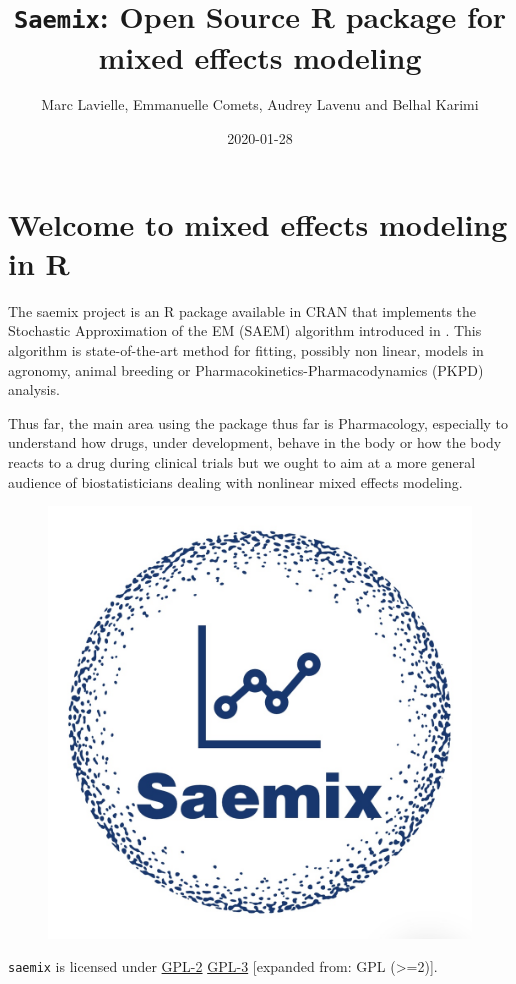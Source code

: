 \documentclass[]{book}
\title{\texttt{Saemix}: Open Source R package for mixed effects modeling}
\author{Marc Lavielle, Emmanuelle Comets, Audrey Lavenu and Belhal Karimi}
\date{2020-01-28}
\begin{document}
\maketitle

{
\hypersetup{linkcolor=black}
\setcounter{tocdepth}{1}
\tableofcontents
}
\chapter*{Welcome to mixed effects modeling in
R}\label{welcome-to-mixed-effects-modeling-in-r}

The saemix project is an R package available in CRAN that implements the
Stochastic Approximation of the EM (SAEM) algorithm introduced in
\citep{kuhn}. This algorithm is state-of-the-art method for fitting,
possibly non linear, models in agronomy, animal breeding or
Pharmacokinetics-Pharmacodynamics (PKPD) analysis.

Thus far, the main area using the package thus far is Pharmacology,
especially to understand how drugs, under development, behave in the
body or how the body reacts to a drug during clinical trials but we
ought to aim at a more general audience of biostatisticians dealing with
nonlinear mixed effects modeling.

\begin{figure}

{\centering \includegraphics[width=0.6\linewidth]{figures/logo1} 

}

\end{figure}

\texttt{saemix} is licensed under
\href{https://cran.r-project.org/web/licenses/GPL-2}{GPL-2} \textbar{}
\href{https://cran.r-project.org/web/licenses/GPL-3}{GPL-3} {[}expanded
from: GPL (\textgreater{}=2){]}.
\end{document}
